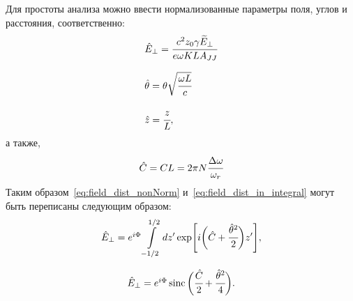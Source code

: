 Для простоты анализа можно ввести нормализованные параметры поля, углов и расстояния, соответственно:
\begin{equation}
	\label{eq:norm_units}
	\begin{array}{lcl}
		\hat{E}_{\bot} = \cfrac{c^2z_0\gamma \widetilde{E}_{\bot}}{e\omega KLA_{JJ}}\\
		\\
		\hat{\theta} = \theta\sqrt{\cfrac{\omega L}{c}}\\
		\\
		\hat{z} = \cfrac{z}{L} ,
	\end{array}	
\end{equation}
а также, 
\begin{equation}
	\hat{C} = CL = 2\pi N\cfrac{\Delta\omega}{\omega_r}
\end{equation}
Таким образом~\ref{eq:field_dist_nonNorm} и~\ref{eq:field_dist_in_integral} могут быть переписаны следующим образом:
\begin{equation}
	\label{eq:field_dist_in_integral}
	\begin{array}{lcl}
		\hat{E}_{\bot} = e^{i\Phi}
		\displaystyle\int\limits_{-1/2}^{1/2} dz'
		\exp[i\bigg(\hat{C} + 
		\cfrac{\hat{\theta}^2}{2}\bigg)z'],
	\end{array}	
\end{equation}

\begin{equation}
	\label{eq:field_dist_Norm}
	\begin{array}{lcl}
		\hat{E}_{\bot} = e^{i\Phi}
		\operatorname{sinc}\bigg(\cfrac{\hat{C}}{2} + 
		\cfrac{\hat{\theta}^2}{4}\bigg).
	\end{array}	
\end{equation}

